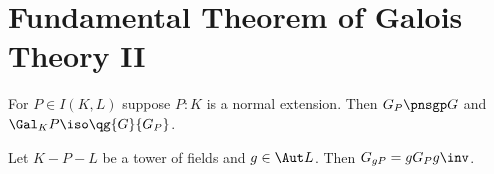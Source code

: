 \documentclass[a4paper]{article}
\begin{document}
\section{Fundamental Theorem of Galois Theory II}
\begin{ttheorem}
  For \( P\in I(K,L) \) suppose \( P:K \) is a normal extension.
  Then \( G_P\pnsgp G \) and \( \Gal_K P \iso \qg{G}{G_P} \).
\end{ttheorem}

\begin{tlemma}
  Let \( K-P-L \) be a tower of fields and \( g\in \Aut L \).
  Then \( G_{gP} = gG_Pg\inv \).
\end{tlemma}


\end{document}
